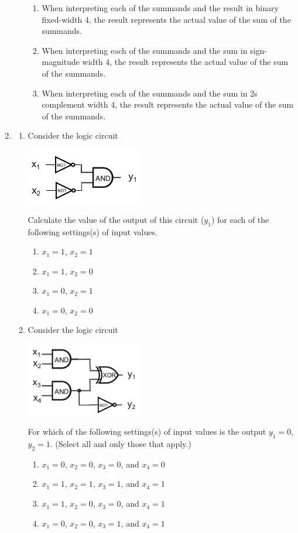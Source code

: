 \documentclass[12pt, oneside]{article}
\begin{document}
\begin{enumerate}
\begin{enumerate}
\begin{enumerate}
        \item When interpreting each of the summands and the result in binary fixed-width 4, 
        the result represents the actual value of the sum of the summands.
        \item When interpreting each of the summands and the sum in sign-magnitude width 4, the result  
        represents the actual value of the sum of the summands.
        \item When interpreting each of the summands and the sum in 2s complement width 4, the result 
        represents the actual value of the sum of the summands.
    \end{enumerate}   
\end{enumerate}

\item 
\begin{enumerate}
\item Consider the logic circuit
    \begin{center}
    \includegraphics[width=2in]{../Resources/images/review-circuit-1.png}
    \end{center}
    Calculate the value of the output of this circuit ($y_1$) for each of the following settings(s) of input values.
    \begin{enumerate}
        \item $x_1 = 1$, $x_2 = 1$
        \item $x_1 = 1$, $x_2 = 0$
        \item $x_1 = 0$, $x_2 = 1$
        \item $x_1 = 0$, $x_2 = 0$
    \end{enumerate}  \item Consider the logic circuit
    \begin{center}
    \includegraphics[width=2in]{../Resources/images/review-circuit-2.png}
    \end{center}
    For which of the following settings(s) of input values is the output
    $y_1 = 0$, $y_2 = 1$. (Select all and only those that apply.)
    \begin{enumerate}
        \item $x_1 = 0$, $x_2 = 0$, $x_3 = 0$, and $x_4 = 0$
        \item $x_1 = 1$, $x_2 = 1$, $x_3 = 1$, and $x_4 = 1$
        \item $x_1 = 1$, $x_2 = 0$, $x_3 = 0$, and $x_4 = 1$
        \item $x_1 = 0$, $x_2 = 0$, $x_3 = 1$, and $x_4 = 1$
    \end{enumerate}
  

\end{enumerate}
\end{enumerate}
\end{document}
